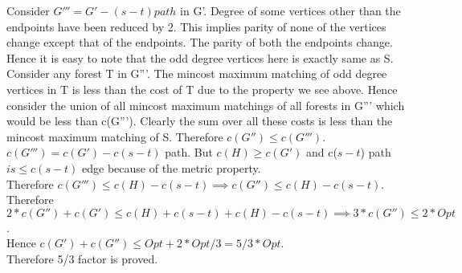 \documentclass[solution,addpoints,12pt]{exam}
\begin{document}
\begin{questions}
\begin{parts}
Consider $G''' = G' - (s-t)path$ in G'. Degree of some vertices
other than the endpoints have been reduced by 2. This implies
parity of none of the vertices change except that of the endpoints.
The parity of both the endpoints change. Hence it is easy to note
that the odd degree vertices here is exactly same as S.
Consider any forest T in G'''. The mincost maximum
matching of odd degree vertices in T is less than the cost of T due
to the property we see above. Hence consider the union of all mincost
maximum matchings of all forests in G''' which would be
less than c(G'''). Clearly
the sum over all these costs is less than the mincost maximum
matching of S. Therefore $c(G'') \le c(G''')$.\\
$c(G''') = c(G') - c(s-t)$ path. But $c(H) \ge c(G')$
and c($s-t$) path $is \le c(s-t)$ edge because of the metric
property.\\
Therefore $c(G''') \le c(H) - c(s-t) \implies c(G'') \le c(H) - c(s-t)$.\\

Therefore $2*c(G'') + c(G') \le c(H) + c(s-t) + c(H) - c(s-t) \implies
3*c(G'') \le 2*Opt$.\\
Hence $c(G') + c(G'') \le Opt + 2*Opt/3 = 5/3*Opt$.\\
Therefore 5/3 factor is proved.
\end{parts}

\question
\begin{parts}

\end{parts}
\end{questions}
\end{document}
